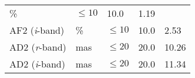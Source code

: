 \documentclass[DM,toc]{lsstdoc}
\begin{document}
\begin{longtable}[]{@{}lllll@{}}
\begin{minipage}[t]{0.08\columnwidth}
\%\strut
\end{minipage} & \begin{minipage}[t]{0.20\columnwidth}\raggedright\strut
\(\leq 10\)\strut
\end{minipage} & \begin{minipage}[t]{0.22\columnwidth}\raggedright\strut
10.0\strut
\end{minipage} & \begin{minipage}[t]{0.17\columnwidth}\raggedright\strut
1.19\strut
\end{minipage}\tabularnewline
\begin{minipage}[t]{0.19\columnwidth}\raggedright\strut
AF2 (\emph{i}-band)\strut
\end{minipage} & \begin{minipage}[t]{0.08\columnwidth}\raggedright\strut
\%\strut
\end{minipage} & \begin{minipage}[t]{0.20\columnwidth}\raggedright\strut
\(\leq 10\)\strut
\end{minipage} & \begin{minipage}[t]{0.22\columnwidth}\raggedright\strut
10.0\strut
\end{minipage} & \begin{minipage}[t]{0.17\columnwidth}\raggedright\strut
2.53\strut
\end{minipage}\tabularnewline
\begin{minipage}[t]{0.19\columnwidth}\raggedright\strut
AD2 (\emph{r}-band)\strut
\end{minipage} & \begin{minipage}[t]{0.08\columnwidth}\raggedright\strut
mas\strut
\end{minipage} & \begin{minipage}[t]{0.20\columnwidth}\raggedright\strut
\(\leq 20\)\strut
\end{minipage} & \begin{minipage}[t]{0.22\columnwidth}\raggedright\strut
20.0\strut
\end{minipage} & \begin{minipage}[t]{0.17\columnwidth}\raggedright\strut
10.26\strut
\end{minipage}\tabularnewline
\begin{minipage}[t]{0.19\columnwidth}\raggedright\strut
AD2 (\emph{i}-band)\strut
\end{minipage} & \begin{minipage}[t]{0.08\columnwidth}\raggedright\strut
mas\strut
\end{minipage} & \begin{minipage}[t]{0.20\columnwidth}\raggedright\strut
\(\leq 20\)\strut
\end{minipage} & \begin{minipage}[t]{0.22\columnwidth}\raggedright\strut
20.0\strut
\end{minipage} & \begin{minipage}[t]{0.17\columnwidth}\raggedright\strut
11.34\strut
\end{minipage}\tabularnewline
\bottomrule
\end{longtable}
\end{document}
